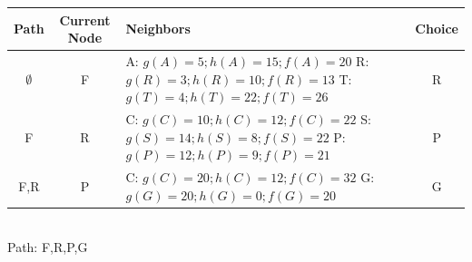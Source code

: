 \documentclass{math}
\begin{document}
\begin{center}
  \begin{tabular}{|c|c|p{8cm}|c|}
    \hline
    Path & Current Node & Neighbors & Choice \\ \hline
    \( \emptyset \) & F &
      A: \( g(A) = 5; h(A) = 15; f(A) = 20 \) \newline
      R: \( g(R) = 3; h(R) = 10; f(R) = 13 \) \newline
      T: \( g(T) = 4; h(T) = 22; f(T) = 26 \)
      & R \\ \hline
    F & R &
      C: \( g(C) = 10; h(C) = 12; f(C) = 22 \) \newline
      S: \( g(S) = 14; h(S) = 8; f(S) = 22 \) \newline
      P: \( g(P) = 12; h(P) = 9; f(P) = 21 \)
      & P \\ \hline
    F,R & P &
      C: \( g(C) = 20; h(C) = 12; f(C) = 32 \) \newline
      G: \( g(G) = 20; h(G) = 0; f(G) = 20 \)
      & G \\ \hline
  \end{tabular} \\[0.5cm]
  Path: F,R,P,G
\end{center}
\end{document}
